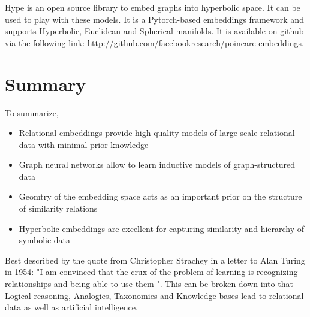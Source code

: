 Hype is an open source library to embed graphs into hyperbolic space. It can be used to play with these models. It is a Pytorch-based embeddings framework and supports Hyperbolic, Euclidean and Spherical manifolds. It is available on github via the following link: http://github.com/facebookresearch/poincare-embeddings.


\section{Summary}

To summarize, 

\begin{itemize}
    \item Relational embeddings provide high-quality models of large-scale relational data with minimal prior knowledge
    \item Graph neural networks allow to learn inductive models of graph-structured data
    \item Geomtry of the embedding space acts as an important prior on the structure of similarity relations
    \item Hyperbolic embeddings are excellent for capturing similarity and hierarchy of symbolic data
\end{itemize}

Best described by the quote from Christopher Strachey in a letter to Alan Turing in 1954: "I am convinced that the crux of the problem of learning is recognizing relationships and being able to use them ". This can be broken down into that Logical reasoning, Analogies, Taxonomies and Knowledge bases lead to relational data as well as artificial intelligence.
